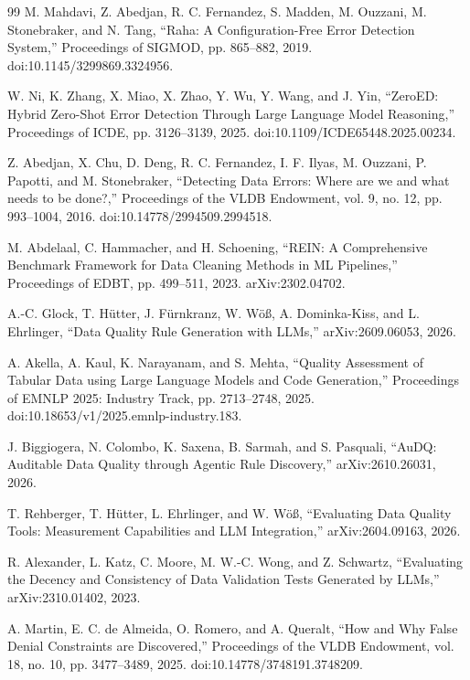 \documentclass[11pt,a4paper]{article}
\begin{document}
\begin{thebibliography}{99}
 M. Mahdavi, Z. Abedjan, R. C. Fernandez, S. Madden, M. Ouzzani, M. Stonebraker, and N. Tang, ``Raha: A Configuration-Free Error Detection System,'' Proceedings of SIGMOD, pp. 865--882, 2019. doi:10.1145/3299869.3324956.

 W. Ni, K. Zhang, X. Miao, X. Zhao, Y. Wu, Y. Wang, and J. Yin, ``ZeroED: Hybrid Zero-Shot Error Detection Through Large Language Model Reasoning,'' Proceedings of ICDE, pp. 3126--3139, 2025. doi:10.1109/ICDE65448.2025.00234.

 Z. Abedjan, X. Chu, D. Deng, R. C. Fernandez, I. F. Ilyas, M. Ouzzani, P. Papotti, and M. Stonebraker, ``Detecting Data Errors: Where are we and what needs to be done?,'' Proceedings of the VLDB Endowment, vol. 9, no. 12, pp. 993--1004, 2016. doi:10.14778/2994509.2994518.

 M. Abdelaal, C. Hammacher, and H. Schoening, ``REIN: A Comprehensive Benchmark Framework for Data Cleaning Methods in ML Pipelines,'' Proceedings of EDBT, pp. 499--511, 2023. arXiv:2302.04702.

 A.-C. Glock, T. H\"utter, J. F\"urnkranz, W. W\"o{\ss}, A. Dominka-Kiss, and L. Ehrlinger, ``Data Quality Rule Generation with LLMs,'' arXiv:2609.06053, 2026.

 A. Akella, A. Kaul, K. Narayanam, and S. Mehta, ``Quality Assessment of Tabular Data using Large Language Models and Code Generation,'' Proceedings of EMNLP 2025: Industry Track, pp. 2713--2748, 2025. doi:10.18653/v1/2025.emnlp-industry.183.

 J. Biggiogera, N. Colombo, K. Saxena, B. Sarmah, and S. Pasquali, ``AuDQ: Auditable Data Quality through Agentic Rule Discovery,'' arXiv:2610.26031, 2026.

 T. Rehberger, T. H\"utter, L. Ehrlinger, and W. W\"o{\ss}, ``Evaluating Data Quality Tools: Measurement Capabilities and LLM Integration,'' arXiv:2604.09163, 2026.

 R. Alexander, L. Katz, C. Moore, M. W.-C. Wong, and Z. Schwartz, ``Evaluating the Decency and Consistency of Data Validation Tests Generated by LLMs,'' arXiv:2310.01402, 2023.

 A. Martin, E. C. de Almeida, O. Romero, and A. Queralt, ``How and Why False Denial Constraints are Discovered,'' Proceedings of the VLDB Endowment, vol. 18, no. 10, pp. 3477--3489, 2025. doi:10.14778/3748191.3748209.


\end{thebibliography}
\end{document}
